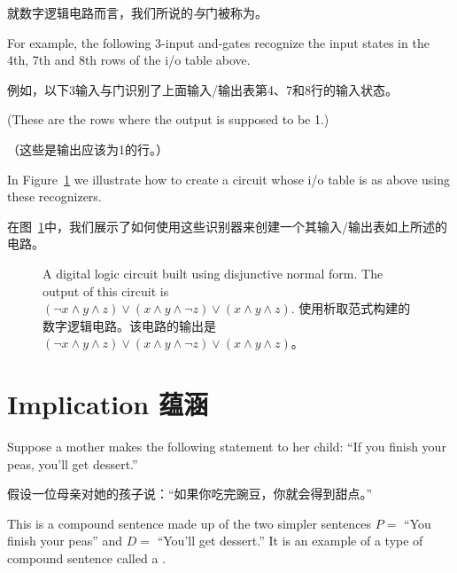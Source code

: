 就数字逻辑电路而言，我们所说的{\em 与}门被称为。

For example,
the following 3-input and-gates recognize the input states in
the 4th, 7th and 8th rows of the i/o table above.

例如，以下3输入与门识别了上面输入/输出表第4、7和8行的输入状态。

(These are the rows 
where the output is supposed to be 1.)

（这些是输出应该为1的行。）

\begin{center}

\end{center}

In Figure~\ref{fig:dnf} we illustrate how to create a circuit whose
i/o table is as above using these recognizers.

在图~\ref{fig:dnf}中，我们展示了如何使用这些识别器来创建一个其输入/输出表如上所述的电路。

\begin{figure}[!hbtp] 
\begin{center}

\end{center}
\caption[Disjunctive normal form.]{A digital logic circuit built %
using disjunctive normal form.
The output of this circuit is %
$({\lnot}x \land y \land z) \lor (x \land y \land {\lnot}z) \lor (x \land y \land z)$. 使用析取范式构建的数字逻辑电路。该电路的输出是 $({\lnot}x \land y \land z) \lor (x \land y \land {\lnot}z) \lor (x \land y \land z)$。}
\label{fig:dnf}
\end{figure}

\newpage




\newpage

\section{Implication 蕴涵}
\label{sec:impl}

Suppose a mother makes the following statement to her child:
``If you finish your peas, you'll get dessert.''

假设一位母亲对她的孩子说：“如果你吃完豌豆，你就会得到甜点。”

This is a compound sentence made up of the two simpler
sentences $P=$ ``You finish your peas'' and $D=$ ``You'll get dessert.''
It is an example of a type of compound sentence called a 
.

